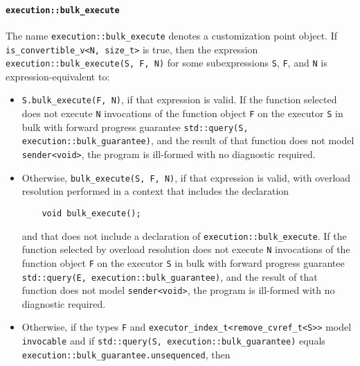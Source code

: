 \documentclass[a4paper,12pt,notitlepage,twoside,openright]{article}
\begin{document}
\hypertarget{executionbulk_execute}{%
\paragraph{\texorpdfstring{\texttt{execution::bulk_execute}}{}}\label{executionbulk_execute}}

The name \texttt{execution::bulk_execute} denotes a
customization point object. If
\texttt{is_convertible_v<N, size_t>} is true, then the
expression \texttt{execution::bulk_execute(S, F, N)} for
some subexpressions \texttt{S}, \texttt{F}, and
\texttt{N} is expression-equivalent to:

\begin{itemize}
\item
  \texttt{S.bulk_execute(F, N)}, if that expression is
  valid. If the function selected does not execute
  \texttt{N} invocations of the function object
  \texttt{F} on the executor \texttt{S} in bulk
  with forward progress guarantee
  \texttt{std::query(S, execution::bulk_guarantee)}, and the
  result of that function does not model
  \texttt{sender<void>}, the program is ill-formed with no
  diagnostic required.
\item
  Otherwise, \texttt{bulk_execute(S, F, N)}, if that
  expression is valid, with overload resolution performed in a context
  that includes the declaration

  \begin{verbatim}
    void bulk_execute();
  \end{verbatim}

  and that does not include a declaration of
  \texttt{execution::bulk_execute}. If the function selected
  by overload resolution does not execute \texttt{N}
  invocations of the function object \texttt{F} on the
  executor \texttt{S} in bulk with forward progress
  guarantee
  \texttt{std::query(E, execution::bulk_guarantee)}, and the
  result of that function does not model
  \texttt{sender<void>}, the program is ill-formed with no
  diagnostic required.
\item
  Otherwise, if the types \texttt{F} and
  \texttt{executor_index_t<remove_cvref_t<S>>} model
  \texttt{invocable} and if
  \texttt{std::query(S, execution::bulk_guarantee)} equals
  \texttt{execution::bulk_guarantee.unsequenced}, then


\end{itemize}
\end{document}
